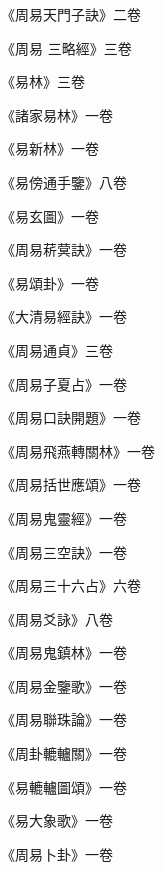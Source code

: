 \begin{pinyinscope}
 《周易天門子訣》二卷



 《周易
 三略經》三卷



 《易林》三卷



 《諸家易林》一卷



 《易新林》一卷



 《易傍通手鑒》八卷



 《易玄圖》一卷



 《周易菥蓂訣》一卷



 《易頌卦》一卷



 《大清易經訣》一卷



 《周易通貞》三卷



 《周易子夏占》一卷



 《周易口訣開題》一卷



 《周易飛燕轉關林》一卷



 《周易括世應頌》一卷



 《周易鬼靈經》一卷



 《周易三空訣》一卷



 《周易三十六占》六卷



 《周易爻詠》八卷



 《周易鬼鎮林》一卷



 《周易金鑒歌》一卷



 《周易聯珠論》一卷



 《周卦轆轤關》一卷



 《易轆轤圖頌》一卷



 《易大象歌》一卷



 《周易卜卦》一卷




\end{pinyinscope}
